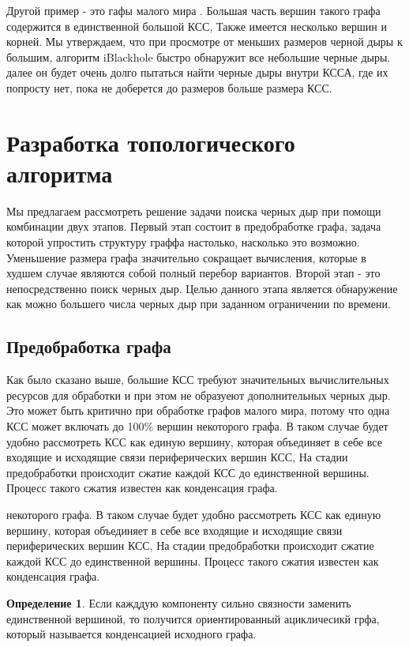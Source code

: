 \documentclass[12pt,a4paper,oneside]{article}
\theoremstyle{definition}
\newtheorem{definition}{Определение}[]
\theoremstyle{lemma}
\theoremstyle{remark}
\begin{document}
Другой пример - это гафы малого мира \cite{watts1999networks}. Большая часть вершин такого графа содержится в единственной большой КСС, Также имеется несколько вершин и корней. Мы утверждаем, что при просмотре от меньших размеров черной дыры к большим, алгоритм iBlackhole быстро обнаружит все небольшие черные дыры. далее он будет очень долго пытаться найти черные дыры внутри КССА, где их попросту нет, пока не доберется до размеров больше размера КСС.

\section{Разработка топологического алгоритма}\label{sec:topalgodesign}

Мы предлагаем рассмотреть решение задачи поиска черных дыр при помощи комбинации двух этапов. Первый этап состоит в предобработке графа, задача которой упростить структуру граффа настолько, насколько это возможно. Уменьшение размера графа значительно сокращает вычисления, которые в худшем случае являются собой полный перебор вариантов. Второй этап - это непосредственно поиск черных дыр. Целью данного этапа является обнаружение как можно большего числа черных дыр при заданном ограничении по времени.

\subsection{Предобработка графа}\label{subsec:graphpreprocessing}

Как было сказано выше, большие КСС требуют значительных вычислительных ресурсов для обработки и при этом не образуеют дополнительных черных дыр. Это может быть критично при обработке графов малого мира, потому что одна КСС может включать до 100\% вершин некоторого графа. В таком случае будет удобно рассмотреть КСС как единую вершину, которая объединяет в себе все входящие и исходящие связи периферических вершин КСС, На стадии предобработки происходит сжатие каждой КСС до единственной вершины. Процесс такого сжатия известен как конденсация графа.

 некоторого графа. В таком случае будет удобно рассмотреть КСС как единую вершину, которая объединяет в себе все входящие и исходящие связи периферических вершин КСС, На стадии предобработки происходит сжатие каждой КСС до единственной вершины. Процесс такого сжатия известен как конденсация графа.

\begin{definition}
Если кажддую компоненту сильно связности заменить единственной вершиной, то получится ориентированный ацикличесикй грфа, который называется конденсацией исходного графа.
\end{definition}
\end{document}
